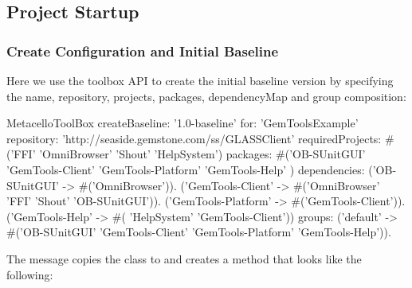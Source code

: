 \documentclass[a4paper,10pt,twoside]{book}
\begin{document}
\begin{code}{}
\begin{code}{}
\subsection{Project Startup}

\subsubsection{Create Configuration and Initial Baseline}
Here we use the toolbox API to create the initial baseline version by specifying the name, repository, projects, packages, dependencyMap and group composition:

\begin{code}{}
  MetacelloToolBox
     createBaseline: '1.0-baseline'
     for: 'GemToolsExample'
     repository: 'http://seaside.gemstone.com/ss/GLASSClient'
     requiredProjects: #('FFI' 'OmniBrowser' 'Shout' 'HelpSystem')
     packages: #('OB-SUnitGUI' 'GemTools-Client' 'GemTools-Platform' 'GemTools-Help' )
     dependencies:
        {('OB-SUnitGUI' -> #('OmniBrowser')).
        ('GemTools-Client' -> #('OmniBrowser' 'FFI' 'Shout' 'OB-SUnitGUI')).
        ('GemTools-Platform' -> #('GemTools-Client')).
        ('GemTools-Help' -> #( 'HelpSystem' 'GemTools-Client'))}
     groups:
        {('default' -> #('OB-SUnitGUI' 'GemTools-Client' 'GemTools-Platform' 'GemTools-Help'))}.
\end{code}                
                
The  message copies the class  to  and creates a  method that looks like the following:


\end{code}
\end{code}
\end{document}
